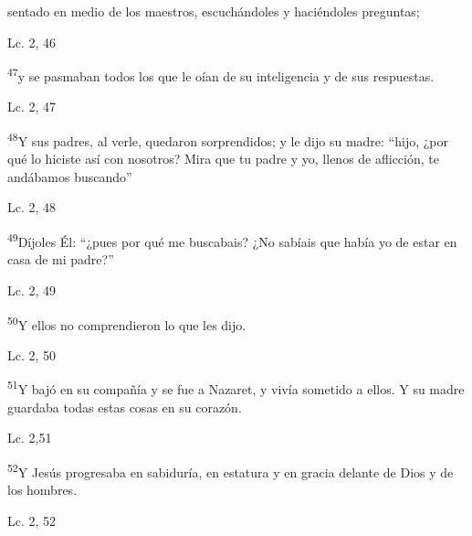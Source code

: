\documentclass[a4paper,11pt]{article}
\begin{document}
      \begin{center}
        sentado en medio de los maestros, escuchándoles y haciéndoles preguntas;
      \end{center}
      \begin{center}
        Lc. 2, 46       
      \end{center}
      
      \begin{center}
        \textsuperscript{47}y se pasmaban todos los que le oían de su inteligencia y de sus respuestas.
      \end{center}
      \begin{center}
        Lc. 2, 47     
      \end{center}

      \begin{center}
        \textsuperscript{48}Y sus padres, al verle, quedaron sorprendidos; y le dijo su madre: ``hijo, ¿por qué lo hiciste así con nosotros? Mira que tu padre
        y yo, llenos de aflicción, te andábamos buscando''
      \end{center}
      \begin{center}
        Lc. 2, 48     
      \end{center}
      
      \begin{center}
        \textsuperscript{49}Díjoles Él: ``¿pues por qué me buscabais? ¿No sabíais que había yo de estar en casa de mi padre?''
      \end{center}
      \begin{center}
        Lc. 2, 49        
      \end{center}
      
      \textsuperscript{50}Y ellos no comprendieron lo que les dijo.
      \begin{center}
        Lc. 2, 50        
      \end{center}
      
      \textsuperscript{51}Y bajó en su compañía y se fue a Nazaret, y vivía sometido a ellos. Y su madre guardaba todas estas
      cosas en su corazón.
      \begin{center}
        Lc. 2,51       
      \end{center}      
      
      \textsuperscript{52}Y Jesús progresaba en sabiduría, en estatura y en gracia delante de Dios y de los hombres.
      \begin{center}
        Lc. 2, 52        
      \end{center}
            
\end{document}
